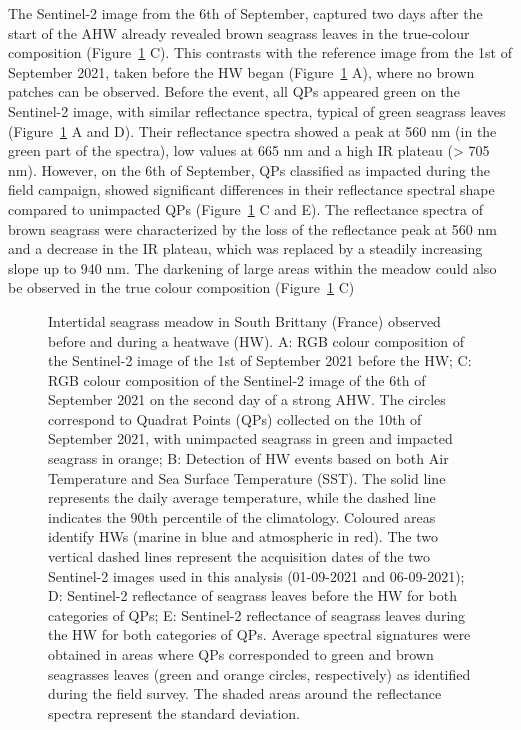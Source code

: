 \documentclass[
  letterpaper,
  11pt,
  english,
  singlespacing,
  headsepline]{MastersDoctoralThesis}
\begin{document}
\begin{spacing}{1.5}
The Sentinel-2 image from the 6th of September, captured two days after
the start of the AHW already revealed brown seagrass leaves in the
true-colour composition (Figure~\ref{fig-S2_comparison} C). This
contrasts with the reference image from the 1st of September 2021, taken
before the HW began (Figure~\ref{fig-S2_comparison} A), where no brown
patches can be observed. Before the event, all QPs appeared green on the
Sentinel-2 image, with similar reflectance spectra, typical of green
seagrass leaves (Figure~\ref{fig-S2_comparison} A and D). Their
reflectance spectra showed a peak at 560 nm (in the green part of the
spectra), low values at 665 nm and a high IR plateau (\textgreater{} 705
nm). However, on the 6th of September, QPs classified as impacted during
the field campaign, showed significant differences in their reflectance
spectral shape compared to unimpacted QPs
(Figure~\ref{fig-S2_comparison} C and E). The reflectance spectra of
brown seagrass were characterized by the loss of the reflectance peak at
560 nm and a decrease in the IR plateau, which was replaced by a
steadily increasing slope up to 940 nm. The darkening of large areas
within the meadow could also be observed in the true colour composition
(Figure~\ref{fig-S2_comparison} C)

\begin{figure}


\caption{\label{fig-S2_comparison}Intertidal seagrass meadow in South
Brittany (France) observed before and during a heatwave (HW). A: RGB
colour composition of the Sentinel-2 image of the 1st of September 2021
before the HW; C: RGB colour composition of the Sentinel-2 image of the
6th of September 2021 on the second day of a strong AHW. The circles
correspond to Quadrat Points (QPs) collected on the 10th of September
2021, with unimpacted seagrass in green and impacted seagrass in orange;
B: Detection of HW events based on both Air Temperature and Sea Surface
Temperature (SST). The solid line represents the daily average
temperature, while the dashed line indicates the 90th percentile of the
climatology. Coloured areas identify HWs (marine in blue and atmospheric
in red). The two vertical dashed lines represent the acquisition dates
of the two Sentinel-2 images used in this analysis (01-09-2021 and
06-09-2021); D: Sentinel-2 reflectance of seagrass leaves before the HW
for both categories of QPs; E: Sentinel-2 reflectance of seagrass leaves
during the HW for both categories of QPs. Average spectral signatures
were obtained in areas where QPs corresponded to green and brown
seagrasses leaves (green and orange circles, respectively) as identified
during the field survey. The shaded areas around the reflectance spectra
represent the standard deviation.}


\end{figure}
\end{spacing}
\end{document}
